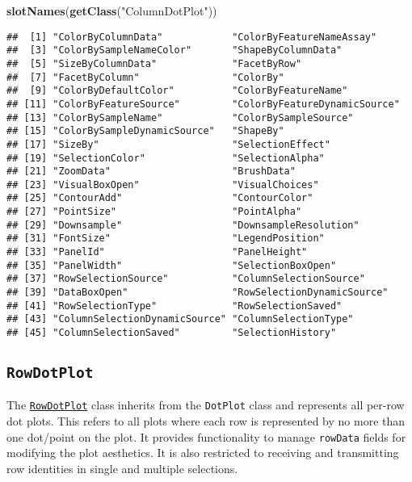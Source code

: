 \documentclass[
]{book}
\newenvironment{Shaded}{\begin{snugshade}}{\end{snugshade}}
\newcommand{\KeywordTok}[1]{\textcolor[rgb]{0.13,0.29,0.53}{\textbf{#1}}}
\newcommand{\NormalTok}[1]{#1}
\newcommand{\StringTok}[1]{\textcolor[rgb]{0.31,0.60,0.02}{#1}}
\begin{document}
\begin{Shaded}
\begin{Highlighting}[]
\KeywordTok{slotNames}\NormalTok{(}\KeywordTok{getClass}\NormalTok{(}\StringTok{"ColumnDotPlot"}\NormalTok{))}
\end{Highlighting}
\end{Shaded}

\begin{verbatim}
##  [1] "ColorByColumnData"            "ColorByFeatureNameAssay"     
##  [3] "ColorBySampleNameColor"       "ShapeByColumnData"           
##  [5] "SizeByColumnData"             "FacetByRow"                  
##  [7] "FacetByColumn"                "ColorBy"                     
##  [9] "ColorByDefaultColor"          "ColorByFeatureName"          
## [11] "ColorByFeatureSource"         "ColorByFeatureDynamicSource" 
## [13] "ColorBySampleName"            "ColorBySampleSource"         
## [15] "ColorBySampleDynamicSource"   "ShapeBy"                     
## [17] "SizeBy"                       "SelectionEffect"             
## [19] "SelectionColor"               "SelectionAlpha"              
## [21] "ZoomData"                     "BrushData"                   
## [23] "VisualBoxOpen"                "VisualChoices"               
## [25] "ContourAdd"                   "ContourColor"                
## [27] "PointSize"                    "PointAlpha"                  
## [29] "Downsample"                   "DownsampleResolution"        
## [31] "FontSize"                     "LegendPosition"              
## [33] "PanelId"                      "PanelHeight"                 
## [35] "PanelWidth"                   "SelectionBoxOpen"            
## [37] "RowSelectionSource"           "ColumnSelectionSource"       
## [39] "DataBoxOpen"                  "RowSelectionDynamicSource"   
## [41] "RowSelectionType"             "RowSelectionSaved"           
## [43] "ColumnSelectionDynamicSource" "ColumnSelectionType"         
## [45] "ColumnSelectionSaved"         "SelectionHistory"
\end{verbatim}

\hypertarget{rowdotplot}{%
\subsection{\texorpdfstring{\texttt{RowDotPlot}}{RowDotPlot}}\label{rowdotplot}}

The \href{https://isee.github.io/iSEE/reference/RowDotPlot-class.html}{\texttt{RowDotPlot}} class inherits from the \texttt{DotPlot} class and represents all per-row dot plots.
This refers to all plots where each row is represented by no more than one dot/point on the plot.
It provides functionality to manage \texttt{rowData} fields for modifying the plot aesthetics.
It is also restricted to receiving and transmitting row identities in single and multiple selections.
\end{document}
